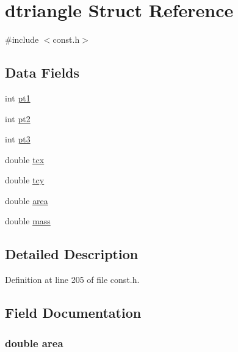 \hypertarget{structdtriangle}{}\section{dtriangle Struct Reference}
\label{structdtriangle}


{\ttfamily \#include $<$const.\+h$>$}

\subsection*{Data Fields}
\begin{DoxyCompactItemize}
\item 
int \hyperlink{structdtriangle_ad4dd21cfb36fef8c13b031ef8d129cda}{pt1}
\item 
int \hyperlink{structdtriangle_a2f2da6c89bdba6cc078fa38551e01883}{pt2}
\item 
int \hyperlink{structdtriangle_ae702403b2e0fc6a7c2b67e13ccbd8fc2}{pt3}
\item 
double \hyperlink{structdtriangle_a35321f9e48b2f5cfb8aecd31b5cc159f}{tcx}
\item 
double \hyperlink{structdtriangle_ad7e4839fedb247de52c88116356dd33e}{tcy}
\item 
double \hyperlink{structdtriangle_ae517bffd82b9428b4f1d9500ea01c04f}{area}
\item 
double \hyperlink{structdtriangle_a244bf42c46054cf1113be44d55f2156d}{mass}
\end{DoxyCompactItemize}


\subsection{Detailed Description}


Definition at line 205 of file const.\+h.



\subsection{Field Documentation}
\hypertarget{structdtriangle_ae517bffd82b9428b4f1d9500ea01c04f}{}
\subsubsection[{area}]{\setlength{\rightskip}{0pt plus 5cm}double area}\label{structdtriangle_ae517bffd82b9428b4f1d9500ea01c04f}


